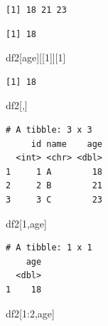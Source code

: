 \documentclass[
  letterpaper,
  DIV=11,
  numbers=noendperiod]{scrreprt}
\newenvironment{Shaded}{\begin{snugshade}}{\end{snugshade}}
\newcommand{\DecValTok}[1]{\textcolor[rgb]{0.68,0.00,0.00}{#1}}
\newcommand{\NormalTok}[1]{\textcolor[rgb]{0.00,0.23,0.31}{#1}}
\newcommand{\SpecialCharTok}[1]{\textcolor[rgb]{0.37,0.37,0.37}{#1}}
\newcommand{\StringTok}[1]{\textcolor[rgb]{0.13,0.47,0.30}{#1}}
\begin{document}
\begin{verbatim}
[1] 18 21 23
\end{verbatim}

\begin{Shaded}
\end{Shaded}

\begin{verbatim}
[1] 18
\end{verbatim}

\begin{Shaded}
\begin{Highlighting}[]
\NormalTok{df2[}\StringTok{\textquotesingle{}age\textquotesingle{}}\NormalTok{][[}\DecValTok{1}\NormalTok{]][}\DecValTok{1}\NormalTok{]}
\end{Highlighting}
\end{Shaded}

\begin{verbatim}
[1] 18
\end{verbatim}

\begin{Shaded}
\begin{Highlighting}[]
\NormalTok{df2[,]}
\end{Highlighting}
\end{Shaded}

\begin{verbatim}
# A tibble: 3 x 3
     id name    age
  <int> <chr> <dbl>
1     1 A        18
2     2 B        21
3     3 C        23
\end{verbatim}

\begin{Shaded}
\begin{Highlighting}[]
\NormalTok{df2[}\DecValTok{1}\NormalTok{,}\StringTok{\textquotesingle{}age\textquotesingle{}}\NormalTok{]}
\end{Highlighting}
\end{Shaded}

\begin{verbatim}
# A tibble: 1 x 1
    age
  <dbl>
1    18
\end{verbatim}

\begin{Shaded}
\begin{Highlighting}[]
\NormalTok{df2[}\DecValTok{1}\SpecialCharTok{:}\DecValTok{2}\NormalTok{,}\StringTok{\textquotesingle{}age\textquotesingle{}}\NormalTok{]}
\end{Highlighting}
\end{Shaded}
\end{document}
